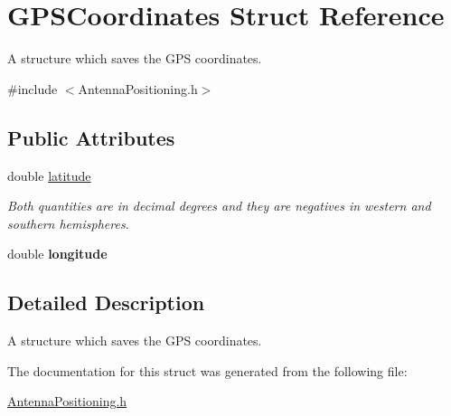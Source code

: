 \hypertarget{structGPSCoordinates}{}\section{G\+P\+S\+Coordinates Struct Reference}
\label{structGPSCoordinates}


A structure which saves the G\+PS coordinates.  




{\ttfamily \#include $<$Antenna\+Positioning.\+h$>$}

\subsection*{Public Attributes}
\begin{DoxyCompactItemize}
\item 
\mbox{\label{structGPSCoordinates_ab4a3d3e2b7e7f5d13a4fe0779ccc2724}} 
double \hyperlink{structGPSCoordinates_ab4a3d3e2b7e7f5d13a4fe0779ccc2724}{latitude}
\begin{DoxyCompactList}\small\item\em Both quantities are in decimal degrees and they are negatives in western and southern hemispheres. \end{DoxyCompactList}\item 
\mbox{\label{structGPSCoordinates_a1696c867f5a1d459e7a5ea11f43c3f9e}} 
double {\bfseries longitude}
\end{DoxyCompactItemize}


\subsection{Detailed Description}
A structure which saves the G\+PS coordinates. 

The documentation for this struct was generated from the following file\+:\begin{DoxyCompactItemize}
\item 
\hyperlink{AntennaPositioning_8h}{Antenna\+Positioning.\+h}\end{DoxyCompactItemize}
